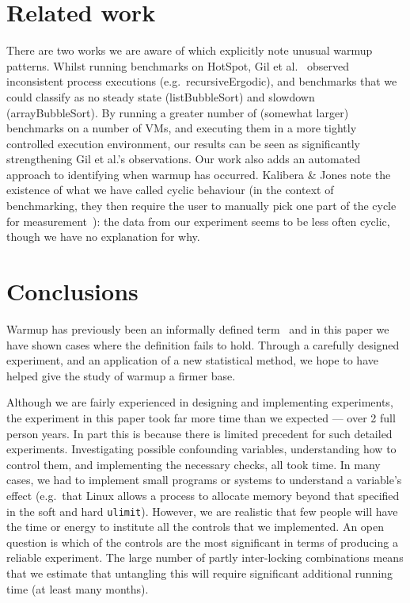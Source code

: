 \documentclass[acmlarge]{acmart}\settopmatter{printfolios=true}
\newcommand{\kalibera}{Kalibera \& Jones\xspace}
\begin{document}
\section{Related work}
\label{sec:related}

There are two works we are aware of which explicitly note unusual warmup
patterns. Whilst running benchmarks on HotSpot, Gil et
al.~\cite{gil11microbenchmark} observed inconsistent process executions
(e.g.~recursiveErgodic), and benchmarks that we could classify as no
steady state (listBubbleSort) and slowdown (arrayBubbleSort). By running a
greater number of (somewhat larger) benchmarks on a number of VMs, and executing
them in a more tightly controlled execution environment, our results can be seen
as significantly strengthening Gil et al.'s observations. Our work also adds an
automated approach to identifying when warmup has occurred.
\kalibera note the
existence of what we have called cyclic behaviour (in the context of benchmarking,
they then require the user to
manually pick one part of the cycle for measurement~\cite{kalibera13rigorous}):
the data from our experiment seems to be less often cyclic, though we have no
explanation for why.


\section{Conclusions}
\label{sec:conclusions}

Warmup has previously been an informally defined term~\cite{seaton15phd} and in this
paper we have shown cases where the definition fails to hold. Through a carefully
designed experiment, and an application of a new statistical method, we hope
to have helped give the study of warmup a firmer base.

Although we are fairly experienced in designing and implementing
experiments, the experiment in this paper took far more time than we expected
--- over 2 full person years. In part this is because there is limited precedent for such detailed
experiments. Investigating possible confounding variables, understanding how to
control them, and implementing the necessary checks, all took time. In many
cases, we had to implement small programs or systems to understand a variable's
effect (e.g.~that Linux allows a process to allocate memory beyond that
specified in the soft and hard \texttt{ulimit}). However, we are realistic that
few people will have the time or energy to institute all the controls that we
implemented. An open question is which of the controls are the most significant
in terms of producing a reliable experiment. The large number of partly
inter-locking combinations means that we estimate that untangling this will
require significant additional running time (at least many months).
\end{document}
